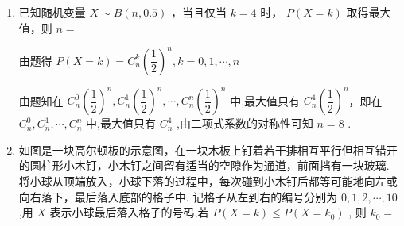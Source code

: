 \begin{enumerate}
\begin{enumerate}
\begin{jieda}
            得:
            
            ${{C}}_{5}^{k}{\left( \dfrac{7}{4}\right) }^{k}{\left( \dfrac{3}{4}\right) }^{5 - k} \geq  {{C}}_{5}^{k + 1}{\left( \dfrac{7}{4}\right) }^{k + 1}{\left( \dfrac{3}{4}\right) }^{4 - k}$
            
            ${{C}}_{5}^{k}{\left( \dfrac{1}{4}\right) }^{k}{\left( \dfrac{3}{4}\right) }^{5 - k} \geq  {{C}}_{5}^{k - 1}{\left( \dfrac{1}{4}\right) }^{k - 1}{\left( \dfrac{3}{4}\right) }^{6 - k}$ ,
            
            解得 $\dfrac{1}{2} \leq  k \leq  \dfrac{3}{2}$ ，又因为 $k \in  {\mathbf{N}}^{ * }$ ，所以 $k = 1$ .
        \end{jieda}

        \item 已知随机变量 $X \sim  B\left( {n,{0.5}}\right)$ ，当且仅当 $k = 4$ 时， $P\left( {X = k}\right)$ 取得最大值，则 $n =$
        \begin{jieda}
            由题得 $P\left( {X = k}\right)  = {{C}}_{n}^{k}{\left( \dfrac{1}{2}\right) }^{n},k = 0,1,\cdots ,n$
            
            由题知在 ${{C}}_{n}^{0}{\left( \dfrac{1}{2}\right) }^{n},{{C}}_{n}^{1}{\left( \dfrac{1}{2}\right) }^{n},\cdots ,{{C}}_{n}^{n}{\left( \dfrac{1}{2}\right) }^{n}$ 中,最大值只有 ${{C}}_{n}^{4}{\left( \dfrac{1}{2}\right) }^{n}$，即在 ${{C}}_{n}^{0},{{C}}_{n}^{1},\cdots ,{{C}}_{n}^{n}$ 中,最大值只有 ${{C}}_{n}^{4}$ ,由二项式系数的对称性可知 $n = 8$ .
        \end{jieda}
        
        \item 如图是一块高尔顿板的示意图，在一块木板上钉着若干排相互平行但相互错开的圆柱形小木钉，小木钉之间留有适当的空隙作为通道，前面挡有一块玻璃. 将小球从顶端放入，小球下落的过程中，每次碰到小木钉后都等可能地向左或向右落下，最后落入底部的格子中. 记格子从左到右的编号分别为 $0,1,2,\cdots ,{10}$ ,用 $X$ 表示小球最后落入格子的号码,若 $P\left( {X = k}\right)  \leq  P\left( {X = {k}_{0}}\right)$ , 则 ${k}_{0} =$


\end{enumerate}
\end{enumerate}
